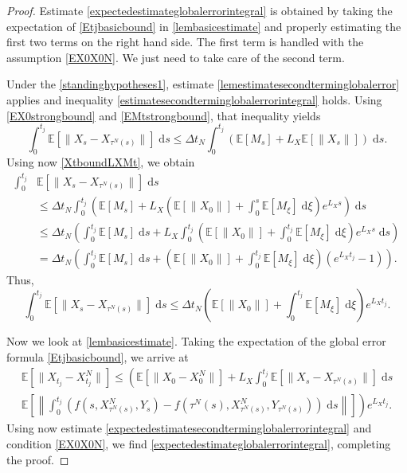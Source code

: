 \documentclass[reqno,12pt]{amsart}
\theoremstyle{plain} %
\theoremstyle{definition} %
\begin{document}
\begin{proof}
    Estimate \eqref{expectedestimateglobalerrorintegral} is obtained by taking the expectation of \eqref{Etjbasicbound} in \cref{lembasicestimate} and properly estimating the first two terms on the right hand side. The first term is handled with the assumption \eqref{EX0X0N}. We just need to take care of the second term.
    
    Under the \cref{standinghypotheses1}, estimate \cref{lemestimatesecondterminglobalerror} applies and inequality \eqref{estimatesecondterminglobalerrorintegral} holds.
    Using \eqref{EX0strongbound} and \eqref{EMtstrongbound}, that inequality yields
    \[
        \int_0^{t_j} \mathbb{E}[\|X_s - X_{\tau^N(s)}\|] \;\mathrm{d}s \leq \Delta t_N \int_0^{t_j} (\mathbb{E}[M_s] + L_X\mathbb{E}[\|X_s\|]) \;\mathrm{d}s.
    \]
    Using now \eqref{XtboundLXMt}, we obtain
    \begin{align*}
        \int_0^{t_j} & \mathbb{E}[\|X_s - X_{\tau^N(s)}\|] \;\mathrm{d}s \\
        & \leq \Delta t_N \int_0^{t_j} \left(\mathbb{E}[M_s] + L_X\left(\mathbb{E}[\|X_0\|] + \int_0^s \mathbb{E}[M_\xi]\;\mathrm{d}\xi\right)e^{L_X s} \right)\;\mathrm{d}s \\
        & \leq \Delta t_N \left(\int_0^{t_j} \mathbb{E}[M_s] \;\mathrm{d}s + L_X \int_0^{t_j}\left(\mathbb{E}[\|X_0\|] + \int_0^{t_j} \mathbb{E}[M_\xi]\;\mathrm{d}\xi\right)e^{L_X s} \;\mathrm{d}s\right) \\
        & = \Delta t_N \left(\int_0^{t_j} \mathbb{E}[M_s] \;\mathrm{d}s + \left(\mathbb{E}[\|X_0\|] + \int_0^{t_j} \mathbb{E}[M_\xi]\;\mathrm{d}\xi\right)\left(e^{L_X t_j} - 1\right) \right).
    \end{align*}
    Thus,
    \begin{equation}
        \label{expectedestimatesecondterminglobalerrorintegral}
        \int_0^{t_j} \mathbb{E}[\|X_s - X_{\tau^N(s)}\|] \;\mathrm{d}s \leq \Delta t_N\left(\mathbb{E}[\|X_0\|] + \int_0^{t_j} \mathbb{E}[M_\xi]\;\mathrm{d}\xi\right)e^{L_X t_j}.
    \end{equation}

    Now we look at \cref{lembasicestimate}. Taking the expectation of the global error formula \eqref{Etjbasicbound}, we arrive at
    \begin{multline*}
        \mathbb{E}\left[\|X_{t_j} - X_{t_j}^N\|\right] \leq \left( \mathbb{E}\left[\|X_0 - X_0^N\|\right] + L_X \int_0^{t_j} \mathbb{E}\left[\|X_s - X_{\tau^N(s)}\|\right] \;\mathrm{d}s \right. \\
        \left. \mathbb{E}\left[\left\|\int_0^{t_j} \left( f(s, X_{\tau^N(s)}^N, Y_s) - f(\tau^N(s), X_{\tau^N(s)}^N, Y_{\tau^N(s)}) \right)\;\mathrm{d}s\right\|\right]\right) e^{L_X t_j}.
    \end{multline*}
    Using now estimate \eqref{expectedestimatesecondterminglobalerrorintegral} and condition \eqref{EX0X0N}, we find \eqref{expectedestimateglobalerrorintegral}, completing the proof.
\end{proof}
\end{document}
